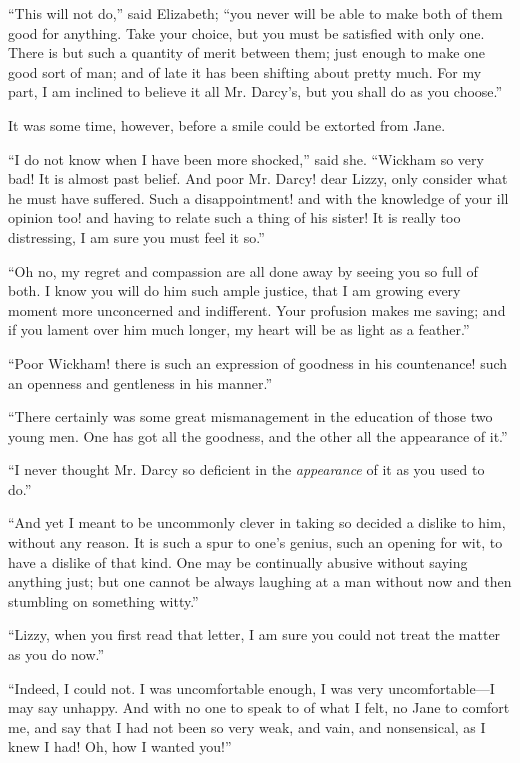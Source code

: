 \documentclass[12pt]{book}
\begin{document}
``This will not do,'' said Elizabeth; ``you never will be able to make both of them good for anything. Take your choice, but you must be satisfied with only one. There is but such a quantity of merit between them; just enough to make one good sort of man; and of late it has been shifting about pretty much. For my part, I am inclined to believe it all Mr. Darcy's, but you shall do as you choose.''

It was some time, however, before a smile could be extorted from Jane.

``I do not know when I have been more shocked,'' said she. ``Wickham so very bad! It is almost past belief. And poor Mr. Darcy! dear Lizzy, only consider what he must have suffered. Such a disappointment! and with the knowledge of your ill opinion too! and having to relate such a thing of his sister! It is really too distressing, I am sure you must feel it so.''

``Oh no, my regret and compassion are all done away by seeing you so full of both. I know you will do him such ample justice, that I am growing every moment more unconcerned and indifferent. Your profusion makes me saving; and if you lament over him much longer, my heart will be as light as a feather.''

``Poor Wickham! there is such an expression of goodness in his countenance! such an openness and gentleness in his manner.''

``There certainly was some great mismanagement in the education of those two young men. One has got all the goodness, and the other all the appearance of it.''

``I never thought Mr. Darcy so deficient in the \textit{appearance} of it as you used to do.''

``And yet I meant to be uncommonly clever in taking so decided a dislike to him, without any reason. It is such a spur to one's genius, such an opening for wit, to have a dislike of that kind. One may be continually abusive without saying anything just; but one cannot be always laughing at a man without now and then stumbling on something witty.''

``Lizzy, when you first read that letter, I am sure you could not treat the matter as you do now.''

``Indeed, I could not. I was uncomfortable enough, I was very uncomfortable---I may say unhappy. And with no one to speak to of what I felt, no Jane to comfort me, and say that I had not been so very weak, and vain, and nonsensical, as I knew I had! Oh, how I wanted you!''
\end{document}
